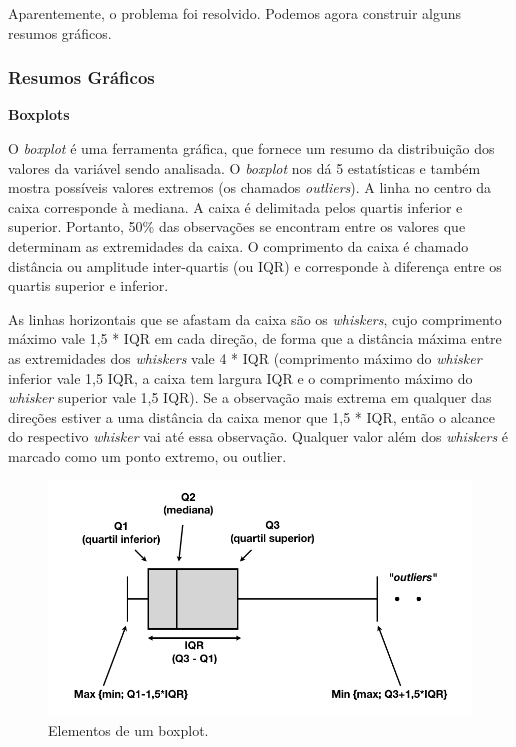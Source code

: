 \documentclass[
]{book}
\theoremstyle{definition}
\theoremstyle{definition}
\theoremstyle{definition}
\theoremstyle{remark}
\begin{document}
Aparentemente, o problema foi resolvido. Podemos agora construir alguns resumos gráficos.

\hypertarget{resumos-gruxe1ficos}{%
\subsubsection*{Resumos Gráficos}\label{resumos-gruxe1ficos}}

\textbf{Boxplots}

O \emph{boxplot} é uma ferramenta gráfica, que fornece um resumo da distribuição dos valores da variável sendo analisada. O \emph{boxplot} nos dá 5 estatísticas e também mostra possíveis valores extremos (os chamados \emph{outliers}). A linha no centro da caixa corresponde à mediana. A caixa é delimitada pelos quartis inferior e superior. Portanto, 50\% das observações se encontram entre os valores que determinam as extremidades da caixa. O comprimento da caixa é chamado distância ou amplitude inter-quartis (ou IQR) e corresponde à diferença entre os quartis superior e inferior.

As linhas horizontais que se afastam da caixa são os \emph{whiskers}, cujo comprimento máximo vale 1,5 * IQR em cada direção, de forma que a distância máxima entre as extremidades dos \emph{whiskers} vale 4 * IQR (comprimento máximo do \emph{whisker} inferior vale 1,5 IQR, a caixa tem largura IQR e o comprimento máximo do \emph{whisker} superior vale 1,5 IQR). Se a observação mais extrema em qualquer das direções estiver a uma distância da caixa menor que 1,5 * IQR, então o alcance do respectivo \emph{whisker} vai até essa observação. Qualquer valor além dos \emph{whiskers} é marcado como um ponto extremo, ou outlier.

\begin{figure}
\includegraphics[width=1\linewidth]{img/boxplot-outliers} \caption{Elementos de um boxplot.}\label{fig:ch1-elementos-boxplot}
\end{figure}
\end{document}
